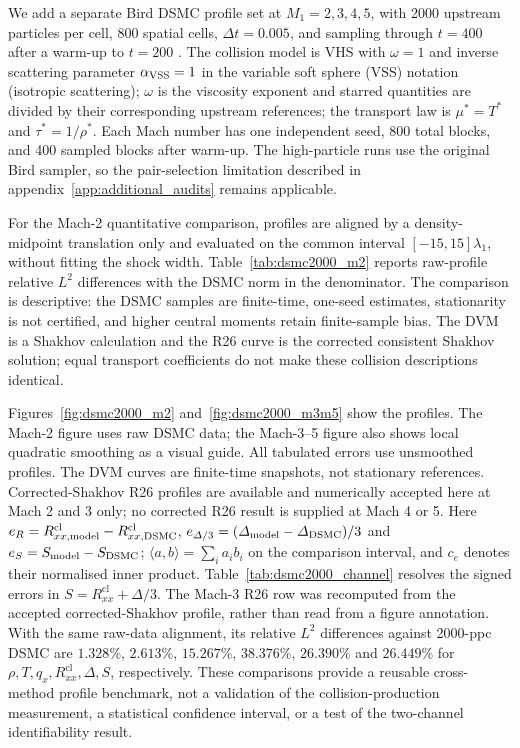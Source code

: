 \documentclass[lineno,paper]{JFM-FLM_Au}
\newenvironment{revision}{\nolinenumbers\begin{tcolorbox}[breakable,colback=revisionyellow,colframe=revisionyellow,boxrule=0pt,arc=0pt,left=5pt,right=5pt,top=5pt,bottom=5pt,before skip=6pt,after skip=6pt]\captionsetup{width=\linewidth}}{\end{tcolorbox}\linenumbers}
\newenvironment{revision}{}{}
\newcommand{\cl}{\mathrm{cl}}
\begin{document}
\begin{revision}
We add a separate Bird DSMC profile set at $M_1=2,3,4,5$, with 2000 upstream particles per cell, 800 spatial cells, $\Delta t=0.005$, and sampling through $t=400$ after a warm-up to $t=200$ \citep{Bird1994}. The collision model is VHS with $\omega=1$ and inverse scattering parameter $\alpha_{\rm VSS}=1$ in the variable soft sphere (VSS) notation (isotropic scattering);
 $\omega$ is the viscosity exponent and
starred quantities are divided by their corresponding upstream references; the transport law is $\mu^*=T^*$ and $\tau^*=1/\rho^*$. Each Mach number has one independent seed, 800 total blocks, and 400 sampled blocks after warm-up. The high-particle runs use the original Bird sampler, so the pair-selection limitation described in appendix~\ref{app:additional_audits} remains applicable.

For the Mach-2 quantitative comparison, profiles are aligned by a density-midpoint translation only and evaluated on the common interval $[-15,15]\lambda_1$, without fitting the shock width. Table~\ref{tab:dsmc2000_m2} reports raw-profile relative $L^2$ differences with the DSMC norm in the denominator. The comparison is descriptive: the DSMC samples are finite-time, one-seed estimates, stationarity is not certified, and higher central moments retain finite-sample bias. The DVM is a Shakhov calculation and the R26 curve is the corrected consistent Shakhov solution; equal transport coefficients do not make these collision descriptions identical.

Figures~\ref{fig:dsmc2000_m2} and~\ref{fig:dsmc2000_m3m5} show the profiles. The Mach-2 figure uses raw DSMC data; the Mach-3--5 figure also shows local quadratic smoothing as a visual guide. All tabulated errors use unsmoothed profiles. The DVM curves are finite-time snapshots, not stationary references. Corrected-Shakhov R26 profiles are available and numerically accepted here at Mach 2 and 3 only; no corrected R26 result is supplied at Mach 4 or 5. Here $e_R=R^{\cl}_{xx,\rm model}-R^{\cl}_{xx,\rm DSMC}$,
$e_{\Delta/3}=(\Delta_{\rm model}-\Delta_{\rm DSMC})/3$ and
$e_S=S_{\rm model}-S_{\rm DSMC}$; $\langle a,b\rangle=\sum_i a_ib_i$
on the comparison interval, and $c_e$ denotes their normalised inner
product. Table~\ref{tab:dsmc2000_channel} resolves the signed errors in $S=R^{\cl}_{xx}+\Delta/3$. The Mach-3 R26 row was recomputed from the accepted corrected-Shakhov profile, rather than read from a figure annotation. With the same raw-data alignment, its relative $L^2$ differences against 2000-ppc DSMC are $1.328\%$, $2.613\%$, $15.267\%$, $38.376\%$, $26.390\%$ and $26.449\%$ for $\rho,T,q_x,R^{\cl}_{xx},\Delta,S$, respectively. These comparisons provide a reusable cross-method profile benchmark, not a validation of the collision-production measurement, a statistical confidence interval, or a test of the two-channel identifiability result.
\end{revision}
\end{document}
